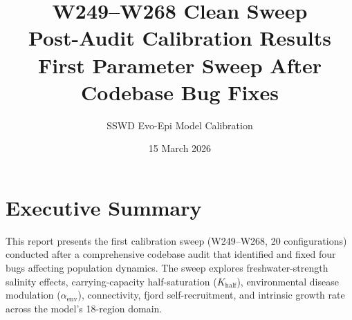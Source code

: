 \documentclass[11pt,a4paper]{article}
\title{\textbf{W249--W268 Clean Sweep}\\[0.3em]
\large Post-Audit Calibration Results\\[0.2em]
\normalsize First Parameter Sweep After Codebase Bug Fixes}
\author{SSWD Evo-Epi Model Calibration}
\date{15 March 2026}
\begin{document}
\maketitle
\thispagestyle{empty}

\section{Executive Summary}

This report presents the first calibration sweep (W249--W268, 20 configurations) conducted after a comprehensive codebase audit that identified and fixed four bugs affecting population dynamics. The sweep explores freshwater-strength salinity effects, carrying-capacity half-saturation ($K_{\text{half}}$), environmental disease modulation ($\alpha_{\text{env}}$), connectivity, fjord self-recruitment, and intrinsic growth rate across the model's 18-region domain.
\end{document}
